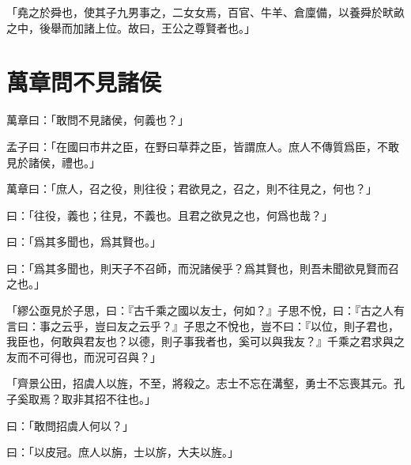 「堯之於舜也，使其子九男事之，二女女焉，百官、牛羊、倉廩備，以養舜於畎畝之中，後舉而加諸上位。故曰，王公之尊賢者也。」\par {}

\section{萬章問不見諸侯}

萬章曰：「敢問不見諸侯，何義也？」

孟子曰：「在國曰市井之臣，在野曰草莽之臣，皆謂庶人。庶人不傳質爲臣，不敢見於諸侯，禮也。」

萬章曰：「庶人，召之役，則往役；君欲見之，召之，則不往見之，何也？」

曰：「往役，義也；往見，不義也。且君之欲見之也，何爲也哉？」

曰：「爲其多聞也，爲其賢也。」

曰：「爲其多聞也，則天子不召師，而況諸侯乎？爲其賢也，則吾未聞欲見賢而召之也。」

「繆公亟見於子思，曰：『古千乘之國以友士，何如？』子思不悅，曰：『古之人有言曰：事之云乎，豈曰友之云乎？』子思之不悅也，豈不曰：『以位，則子君也，我臣也，何敢與君友也？以德，則子事我者也，奚可以與我友？』千乘之君求與之友而不可得也，而況可召與？」

「齊景公田，招虞人以旌，不至，將殺之。志士不忘在溝壑，勇士不忘喪其元。孔子奚取焉？取非其招不往也。」

曰：「敢問招虞人何以？」

曰：「以皮冠。庶人以旃，士以旂，大夫以旌。」

